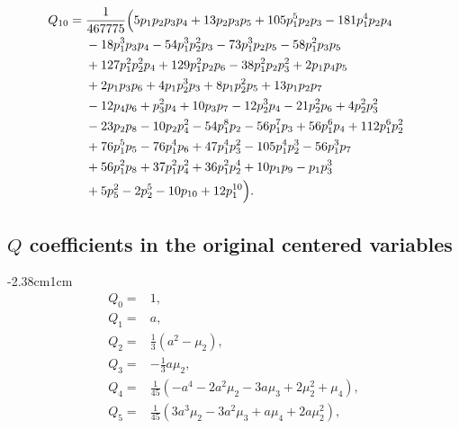 \documentclass[9pt,twocolumn,twoside]{gsajnl}
\begin{document}
\vspace*{-0.5cm}
\begin{equation*}
\hspace*{-0.43cm}
\begin{aligned}
Q_{10}={}&\frac1{467775}\Bigl(
5p_1p_2p_3p_4+13p_2p_3p_5+105p_1^5p_2p_3-181p_1^4p_2p_4
\notag\\
&-18p_1^3p_3p_4-54p_1^3p_2^2p_3-73p_1^3p_2p_5-58p_1^2p_3p_5
\notag\\
&+127p_1^2p_2^2p_4+129p_1^2p_2p_6-38p_1^2p_2p_3^2+2p_1p_4p_5
\notag\\
&+2p_1p_3p_6+4p_1p_2^3p_3+8p_1p_2^2p_5+13p_1p_2p_7
\notag\\
&-12p_4p_6+p_3^2p_4+10p_3p_7-12p_2^3p_4-21p_2^2p_6+4p_2^2p_3^2
\notag\\
&-23p_2p_8-10p_2p_4^2-54p_1^8p_2-56p_1^7p_3+56p_1^6p_4+112p_1^6p_2^2
\notag\\
&+76p_1^5p_5-76p_1^4p_6+47p_1^4p_3^2-105p_1^4p_2^3-56p_1^3p_7
\notag\\
&+56p_1^2p_8+37p_1^2p_4^2+36p_1^2p_2^4+10p_1p_9-p_1p_3^3
\notag\\
&+5p_5^2-2p_2^5-10p_{10}+12p_1^{10}
\Bigr).
\end{aligned}
\end{equation*}

\subsection{$Q$ coefficients in the original centered variables}

\begin{adjustwidth}{-2.38cm}{1cm}
\begin{align}
Q_0={}&1, \label{eq:Q0-amu} \\ \nonumber
Q_1={}&a, \\ \nonumber
Q_2={}&\frac13\left(a^2-\mu_2\right), \\ \nonumber
Q_3={}&-\frac13a\mu_2, \\ \nonumber
Q_4={}&\frac1{45}\left(-a^4-2a^2\mu_2-3a\mu_3+2\mu_2^2+\mu_4\right), \\ \nonumber
Q_5={}&\frac1{45}\left(3a^3\mu_2-3a^2\mu_3+a\mu_4+2a\mu_2^2\right),
\end{align}
\end{adjustwidth}
\end{document}
